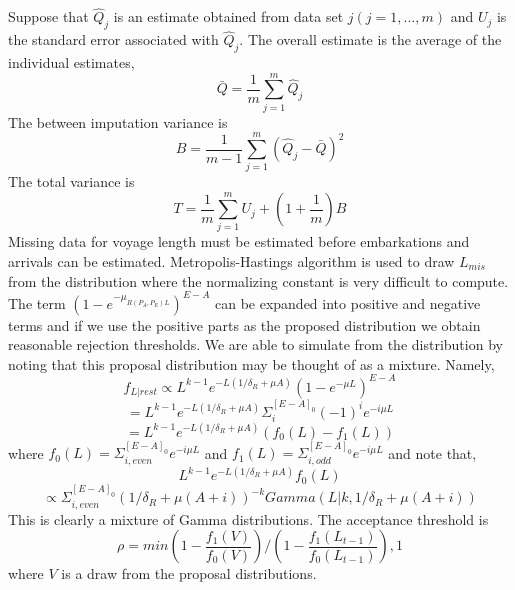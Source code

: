 \documentclass[preprint,12pt]{elsarticle}
\begin{document}
Suppose that $\hat{Q}_j$ is an estimate obtained from data set $j (j=1,...,m)$ and $U_j$ is the standard error associated with $\hat{Q}_j$. The overall estimate is the average of the individual estimates,
\begin{equation}
\bar{Q}=\frac{1}{m}\sum_{j=1}^{m}\hat{Q}_j
\end{equation}
The between imputation variance is 
\begin{equation}
B=\frac{1}{m-1}\sum_{j=1}^{m}(\hat{Q}_j-\bar{Q})^2
\end{equation}
The total variance is 
\begin{equation}
T=\frac{1}{m}\sum_{j=1}^{m}U_j+(1+\frac{1}{m})B
\end{equation}
\indent
Missing data for voyage length must be estimated before embarkations and arrivals can be estimated. Metropolis-Hastings algorithm is used to draw $L_{mis}$ from the distribution where the normalizing constant is very difficult to compute. The term $(1-e^{-\mu_{R(P_A, P_E)L}})^{E-A}$ can be expanded into positive and negative terms and if we use the positive parts as the proposed distribution we obtain reasonable rejection thresholds. We are able to simulate from the distribution by noting that this proposal distribution may be thought of as a mixture. Namely,\\
\begin{equation}
f_{L|rest} \propto L^{k-1}e^{-L(1/\delta_R+\mu A)}(1-e^{-\mu L})^{E-A}
\end{equation}
\begin{equation}
=L^{k-1}e^{-L(1/\delta_R+\mu A)}\Sigma_i^{[E-A]_0}(-1)^i e^{-i\mu L}
\end{equation}
\begin{equation}
=L^{k-1}e^{-L(1/\delta_R+\mu A)}(f_0(L)-f_1(L))
\end{equation}
where $f_0(L)=\Sigma_{i, even}^{[E-A]_0} e^{-i\mu L}$ and $f_1(L)=\Sigma_{i, odd}^{[E-A]_0} e^{-i\mu L}$ and note that,
\begin{equation}
L^{k-1}e^{-L(1/\delta_R+\mu A)}f_0(L)
\end{equation}
\begin{equation}
\propto \Sigma_{i, even}^{[E-A]_0} (1/\delta_R+\mu(A+i))^{-k} Gamma(L|k, 1/\delta_R+\mu(A+i))
\end{equation}
This is clearly a mixture of Gamma distributions. The acceptance threshold is
\begin{equation}
\rho=min{(1-\frac{f_1(V)}{f_0(V)})/(1-\frac{f_1(L_{t-1})}{f_0(L_{t-1})}),1}
\end{equation}
where $V$ is a draw from the proposal distributions.\\
\end{document}

